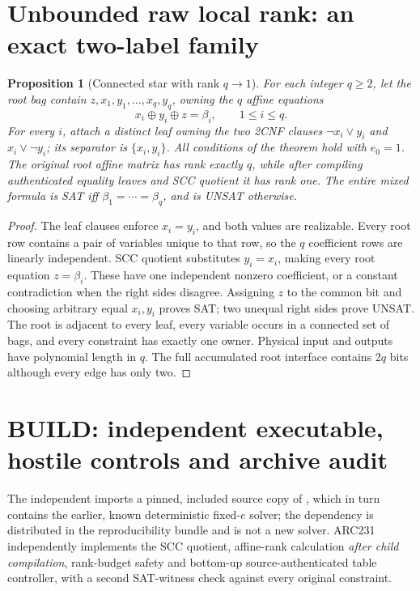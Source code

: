 \documentclass[11pt]{article}
\newtheorem{proposition}[theorem]{Proposition}
\begin{document}
\section{Unbounded raw local rank: an exact two-label family}
\begin{proposition}[Connected star with rank $q\to1$]
For each integer $q\ge2$, let the root bag contain $z,x_1,y_1,\ldots,x_q,y_q$, owning the $q$ affine equations
\[
 x_i\oplus y_i\oplus z=\beta_i,\qquad 1\le i\le q.
\]
For every $i$, attach a distinct leaf owning the two 2CNF clauses $\neg x_i\vee y_i$ and $x_i\vee\neg y_i$; its separator is $\{x_i,y_i\}$. All conditions of the theorem hold with $e_0=1$. The original root affine matrix has rank exactly $q$, while after compiling authenticated equality leaves and SCC quotient it has rank one. The entire mixed formula is SAT iff $\beta_1=\cdots=\beta_q$, and is UNSAT otherwise.
\end{proposition}
\begin{proof}
The leaf clauses enforce $x_i=y_i$, and both values are realizable. Every root row contains a pair of variables unique to that row, so the $q$ coefficient rows are linearly independent. SCC quotient substitutes $y_i=x_i$, making every root equation $z=\beta_i$. These have one independent nonzero coefficient, or a constant contradiction when the right sides disagree. Assigning $z$ to the common bit and choosing arbitrary equal $x_i,y_i$ proves SAT; two unequal right sides prove UNSAT. The root is adjacent to every leaf, every variable occurs in a connected set of bags, and every constraint has exactly one owner. Physical input and outputs have polynomial length in $q$. The full accumulated root interface contains $2q$ bits although every edge has only two.
\end{proof}

\section{BUILD: independent executable, hostile controls and archive audit}
The independent  imports a pinned, included source copy of , which in turn contains the earlier, known deterministic fixed-$e$ solver; the dependency is distributed in the reproducibility bundle and is not a new solver. ARC231 independently implements the SCC quotient, affine-rank calculation \emph{after child compilation}, rank-budget safety and bottom-up source-authenticated table controller, with a second SAT-witness check against every original constraint.
\end{document}
